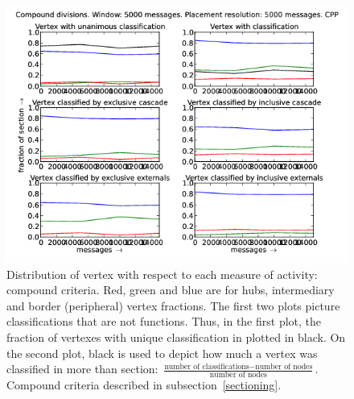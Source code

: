 \documentclass[%
 aip,
 jmp,%
 amsmath,amssymb,
 reprint,%
]{revtex4-1}
\begin{document}
\begin{figure}[hbtp] 
   \centering
        \includegraphics[width=\textwidth]{figs/CPP/5000_2}
    \caption{Distribution of vertex with respect to each measure of activity: compound criteria. Red, green and blue are for hubs, intermediary and border (peripheral) vertex fractions. The first two plots picture classifications that are not functions. Thus, in the first plot, the fraction of vertexes with unique classification in plotted in black. On the second plot, black is used to depict how much a vertex was classified in more than section: $\frac{\text{number of classifications} - \text{number of nodes}}{\text{number of nodes}}$. Compound criteria described in subsection~\ref{sectioning}.}
    \label{fig:cpp5000_}
\end{figure}
\end{document}

